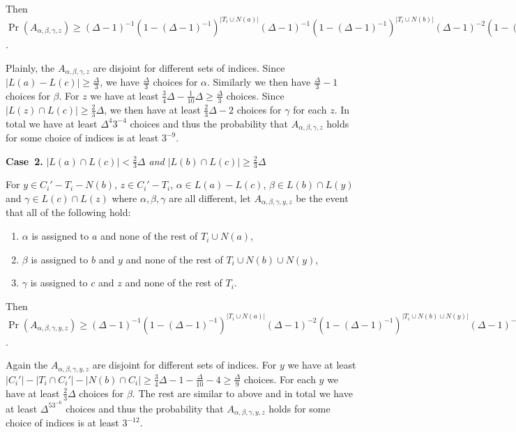 \documentclass[12pt]{article}
\theoremstyle{plain}
\theoremstyle{definition}
\theoremstyle{remark}
\newcommand{\card}[1]{\left|#1\right|}
\begin{document}
Then $\Pr(A_{\alpha, \beta, \gamma, z}) \geq (\Delta-1)^{-1}(1-
(\Delta-1)^{-1})^{\card{T_i \cup N(a)}}(\Delta-1)^{-1}(1-
(\Delta-1)^{-1})^{\card{T_i \cup N(b)}}(\Delta-1)^{-2}(1-
(\Delta-1)^{-1})^{\card{T_i}} \geq (\Delta-1)^{-4}3^{-5}$.

Plainly, the $A_{\alpha, \beta, \gamma, z}$ are disjoint for different sets of
indices.  Since $\card{L(a) - L(c)} \geq \frac{\Delta}{3}$, we have
$\frac{\Delta}{3}$ choices for $\alpha$.  Similarly we then have
$\frac{\Delta}{3} - 1$ choices for $\beta$.  For $z$ we have at least $\frac34
\Delta - \frac{1}{10}\Delta \geq \frac{\Delta}{3}$ choices.  Since $\card{L(z)
\cap L(c)} \geq \frac23 \Delta$, we then have at least $\frac23\Delta - 2$
choices for $\gamma$ for each $z$.  In total we have at least $\Delta^4 3^{-4}$
choices and thus the probability that $A_{\alpha, \beta, \gamma, z}$ holds for
some choice of indices is at least $3^{-9}$.

\textbf{Case~2.} \textit{$\card{L(a) \cap L(c)} < \frac23 \Delta$ and $\card{L(b) \cap
L(c)} \geq \frac23 \Delta$}

For $y \in C_i' - T_i - N(b)$, $z \in C_i' - T_i$, $\alpha \in L(a) - L(c)$,
$\beta \in L(b) \cap L(y)$ and $\gamma \in L(c) \cap L(z)$ where $\alpha, \beta,
\gamma$ are all different, let $A_{\alpha, \beta, \gamma, y, z}$ be the event
that all of the following hold:

\begin{enumerate}
  \item $\alpha$ is assigned to $a$ and none of the rest of $T_i \cup N(a)$,
  \item $\beta$ is assigned to $b$ and $y$ and none of the rest of $T_i \cup
  N(b) \cup N(y)$,
  \item $\gamma$ is assigned to $c$ and $z$ and none of the rest of $T_i$.
\end{enumerate}

Then $\Pr(A_{\alpha, \beta, \gamma, y, z}) \geq (\Delta-1)^{-1}(1-
(\Delta-1)^{-1})^{\card{T_i \cup N(a)}}(\Delta-1)^{-2}(1-
(\Delta-1)^{-1})^{\card{T_i \cup N(b) \cup N(y)}}(\Delta-1)^{-2}(1-
(\Delta-1)^{-1})^{\card{T_i}} \geq (\Delta-1)^{-5}3^{-6}$.

Again the $A_{\alpha, \beta, \gamma, y, z}$ are disjoint for different sets of
indices.  For $y$ we have at least $\card{C_i'} - \card{T_i \cap C_i'} -
\card{N(b) \cap C_i} \geq \frac34 \Delta - 1 - \frac{\Delta}{10} - 4 \geq
\frac{\Delta}{9}$ choices.  For each $y$ we have at least $\frac23 \Delta$ choices for $\beta$. 
The rest are similar to above and in total we have at least $\Delta^53^{-6}$
choices and thus the probability that $A_{\alpha, \beta, \gamma, y, z}$ holds
for some choice of indices is at least $3^{-12}$.
\end{document}
